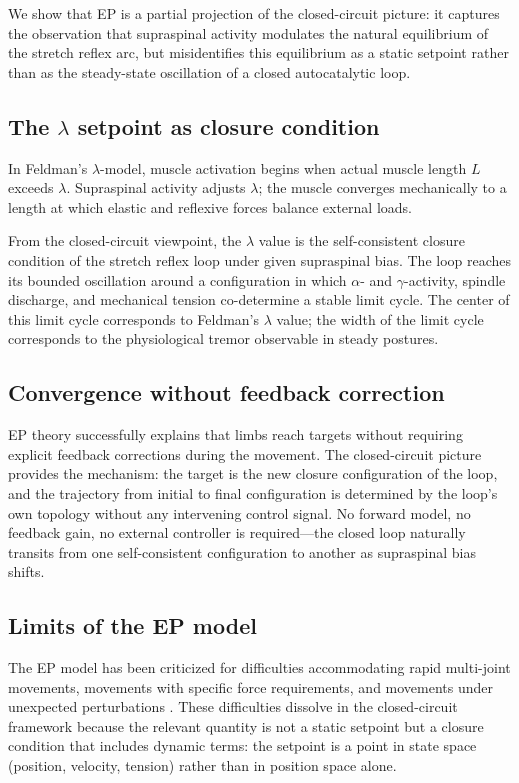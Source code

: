 \documentclass[11pt,twocolumn,a4paper]{article}
\theoremstyle{definition}
\theoremstyle{remark}
\begin{document}
We show that EP is a partial projection of the closed-circuit picture:
it captures the observation that supraspinal activity modulates the
natural equilibrium of the stretch reflex arc, but misidentifies this
equilibrium as a static setpoint rather than as the steady-state
oscillation of a closed autocatalytic loop.

\subsection{The $\lambda$ setpoint as closure condition}

In Feldman's $\lambda$-model, muscle activation begins when actual
muscle length $L$ exceeds $\lambda$. Supraspinal activity adjusts
$\lambda$; the muscle converges mechanically to a length at which
elastic and reflexive forces balance external loads.

From the closed-circuit viewpoint, the $\lambda$ value is the
self-consistent closure condition of the stretch reflex loop under
given supraspinal bias. The loop reaches its bounded oscillation
around a configuration in which $\alpha$- and $\gamma$-activity,
spindle discharge, and mechanical tension co-determine a stable
limit cycle. The center of this limit cycle corresponds to Feldman's
$\lambda$ value; the width of the limit cycle corresponds to the
physiological tremor observable in steady postures.

\subsection{Convergence without feedback correction}

EP theory successfully explains that limbs reach targets without
requiring explicit feedback corrections during the movement. The
closed-circuit picture provides the mechanism: the target is the
new closure configuration of the loop, and the trajectory from initial
to final configuration is determined by the loop's own topology
without any intervening control signal. No forward model, no feedback
gain, no external controller is required---the closed loop naturally
transits from one self-consistent configuration to another as
supraspinal bias shifts.

\subsection{Limits of the EP model}

The EP model has been criticized for difficulties accommodating rapid
multi-joint movements, movements with specific force requirements, and
movements under unexpected perturbations \citep{hinder2003,latash2010}.
These difficulties dissolve in the closed-circuit framework because
the relevant quantity is not a static setpoint but a closure condition
that includes dynamic terms: the setpoint is a point in state space
(position, velocity, tension) rather than in position space alone.
\end{document}
